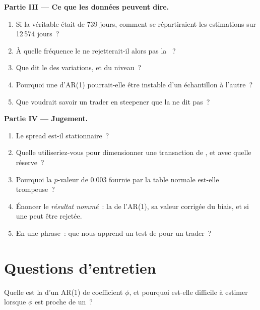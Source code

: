 \begin{problem}
\medskip\noindent\textbf{Partie III --- Ce que les données peuvent dire.}
\begin{enumerate}[resume]
\item Si la véritable  était de 739 jours, comment se répartiraient les estimations sur 12\,574 jours~?
\item À quelle fréquence le  ne rejetterait-il alors pas la ~?
\item Que dit le  des variations, et du niveau~?
\item Pourquoi une  d'AR(1) pourrait-elle être instable d'un échantillon à l'autre~?
\item Que voudrait savoir un trader en steepener que la  ne dit pas~?
\end{enumerate}

\medskip\noindent\textbf{Partie IV --- Jugement.}
\begin{enumerate}[resume]
\item Le spread est-il stationnaire~?
\item Quelle  utiliseriez-vous pour dimensionner une transaction de , et avec quelle réserve~?
\item Pourquoi la $p$-valeur de 0.003 fournie par la table normale est-elle trompeuse~?
\item Énoncer le \emph{résultat nommé}~: la  de l'AR(1), sa valeur corrigée du biais, et si une  peut être rejetée.
\item En une phrase~: que nous apprend un test de  pour un trader~?
\end{enumerate}
\end{problem}

\section{Questions d'entretien}

\begin{interviewq}\label{iq:qm:linear-time-series:1}
Quelle est la  d'un AR(1) de coefficient $\phi$, et pourquoi est-elle difficile à estimer lorsque $\phi$ est proche de un~?
\end{interviewq}

